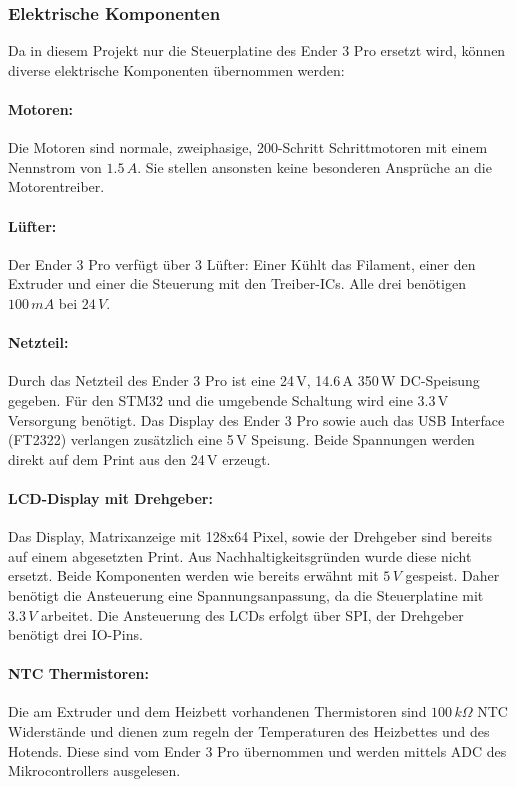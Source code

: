 \subsubsection{Elektrische Komponenten}
\label{sec:ElektrischeKomponenten}

Da in diesem Projekt nur die Steuerplatine des Ender 3 Pro ersetzt wird, können diverse elektrische Komponenten übernommen werden:


\paragraph{Motoren:}
Die Motoren sind normale, zweiphasige, 200-Schritt Schrittmotoren mit einem Nennstrom von $1.5\,\si{A}$. Sie stellen ansonsten keine besonderen Ansprüche an die Motorentreiber.

\paragraph{Lüfter:}
Der Ender 3 Pro verfügt über 3 Lüfter: Einer Kühlt das Filament, einer den Extruder und einer die Steuerung mit den Treiber-ICs. Alle drei benötigen $100\,\si{mA}$ bei $24\,\si{V}$.

\paragraph{Netzteil:}
Durch das Netzteil des Ender 3 Pro ist eine 24\,V, 14.6\,A 350\,W DC-Speisung gegeben. 
Für den STM32 und die umgebende Schaltung wird eine 3.3\,V Versorgung benötigt. 
Das Display des Ender 3 Pro sowie auch das USB Interface (FT2322) verlangen zusätzlich eine 5\,V Speisung. Beide Spannungen werden direkt auf dem Print aus den 24\,V erzeugt.

\paragraph{LCD-Display mit Drehgeber:}
Das Display, Matrixanzeige mit 128x64 Pixel, sowie der Drehgeber sind bereits auf einem abgesetzten Print. Aus Nachhaltigkeitsgründen wurde diese nicht ersetzt. Beide Komponenten werden wie bereits erwähnt mit $5\,\si{V}$ gespeist. Daher benötigt die Ansteuerung eine Spannungsanpassung, da die Steuerplatine mit $3.3\,\si{V}$ arbeitet. Die Ansteuerung des LCDs erfolgt über SPI, der Drehgeber benötigt drei IO-Pins. 

\paragraph{NTC Thermistoren:}
Die am Extruder und dem Heizbett vorhandenen Thermistoren sind $100\,\si{k}\Omega$ NTC Widerstände und dienen zum regeln der Temperaturen des Heizbettes und des Hotends. Diese sind vom Ender 3 Pro übernommen und werden mittels ADC des Mikrocontrollers ausgelesen.
